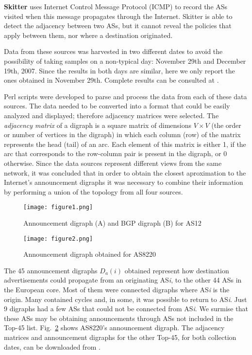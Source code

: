 \documentclass[10pt,final,journal]{IEEEtran}
\begin{document}
\textbf{Skitter} \cite{Skitterproject} uses Internet Control Message Protocol (ICMP) to record the ASs visited when this message propagates through the Internet. Skitter is able to detect the adjacency between two ASs, but it cannot reveal the policies that apply between them, nor where a destination originated.

Data from these sources was harvested in two different dates to avoid the possibility of taking samples on a non-typical day: November 29th and December 19th, 2007. Since the results in both days are similar, here we only report the ones obtained in November 29th. Complete results can be consulted at \cite{Arjona-Villicana2009}.

Perl scripts were developed to parse and process the data from each of these data sources. The data needed to be converted into a format that could be easily analyzed and displayed; therefore adjacency matrices were selected. The \emph{adjacency matrix} of a digraph is a square matrix of dimensions $V \times V$ (the order or number of vertices in the digraph) in which each column (row) of the matrix represents the head (tail) of an arc. Each element of this matrix is either 1, if the arc that corresponds to the row-column pair is present in the digraph, or 0 otherwise. Since the data sources represent different views from the same network, it was concluded that in order to obtain the closest aproximation to the Internet's announcement digraphs it was necessary to combine their information by performing a union of the topology from all four sources.

\begin{figure}[!t]
	\centering
		\texttt{[image: figure1.png]}
	\caption{Announcement digraph (A) and BGP digraph (B) for AS12}
	\label{fig:42_AnnDigraph}
\end{figure}

\begin{figure}[!t]
\texttt{[image: figure2.png]}
	\caption{Announcement digraph obtained for AS8220}
	\label{fig:AnncDigraph}
\end{figure}

The 45 announcement digraphs $D_{a}\left(i\right)$ obtained represent how destination advertisements could propagate from an originating AS\textit{i}, to the other 44 ASs in the European core. Most of them were connected digraphs where AS\textit{i} is the origin. Many contained cycles and, in some, it was possible to return to AS\textit{i}. Just 9 digraphs had a few ASs that could not be connected from AS\textit{i}. We surmise that these ASs may be obtaining announcements through ASs not included in the Top-45 list. Fig.~\ref{fig:AnncDigraph} shows AS8220's announcement digraph. The adjacency matrices and announcement digraphs for the other Top-45, for both collection dates, can be downloaded from \cite{Arjona-Villicana2009}.
\end{document}

